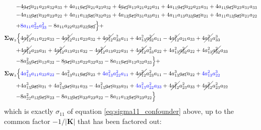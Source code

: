 \documentclass{article}
\begin{document}
\begin{equation}
\begin{aligned}
- & 4 \cancel{a_{12}} a_{21} a_{23} a_{32} a_{33} + 4 a_{11} \cancel{a_{12}} a_{21} a_{23} a_{32} + 4 \cancel{a_{12}} a_{13} a_{21} a_{22} a_{31} + 4 a_{11} \cancel{a_{12}} a_{22} a_{23} a_{31} + 4 a_{11} \cancel{a_{12}} a_{23} a_{31} a_{33} \\
-& 4 a_{13} \cancel{a_{31}} a_{32} a_{23} a_{22} + 4 a_{11} a_{13} \cancel{a_{31}} a_{32} a_{23} + 4 a_{13} \cancel{a_{12}} a_{31} a_{33} a_{21} + 4 a_{11} a_{13} a_{33} \cancel{a_{32}} a_{21} + 4 a_{11} a_{13} \cancel{a_{32}} a_{21} a_{22} \\
+& \textcolor{blue}{8 a_{11} a_{22}^{2} a_{33}^{2}} - 8 a_{11} a_{22} a_{33} a_{23} \cancel{a_{32}}\Bigr\} + \\
 \mathbf{\Sigma}_{\textbf{W}_{2}} \Bigl\{& 4 \cancel{a_{12}^{2}} a_{11} a_{22} a_{33} - 4 \cancel{a_{12}^{2}} a_{11} a_{23} a_{32} + 4 \cancel{a_{12}^{2}} a_{33}^{2} a_{11} + 4 a_{13}^{2} \cancel{a_{32}^{2}} a_{11} - 4 \cancel{a_{12}^{3}} a_{21} a_{33} + 4 \cancel{a_{12}^{2}} a_{33}^{3} \\
+& 4 \cancel{a_{12}^{3}} a_{23} a_{31} + 4 \cancel{a_{12}^{2}} a_{13} a_{21} a_{32} - 4 \cancel{a_{12}^{2}} a_{13} a_{22} a_{31} + 4 \cancel{a_{12}^{2}} a_{33}^{2} a_{22} + 4 a_{13}^{2} \cancel{a_{32}^{2}} a_{22} + 4 a_{13}^{2} \cancel{a_{32}^{2}} a_{33} \\
-& 8 a_{33}^{2} \cancel{a_{12}} a_{13} a_{32} - 8 \cancel{a_{12}} a_{13} a_{22} a_{32} a_{33} - 8 a_{11} \cancel{a_{12}} a_{13} a_{32} a_{33}\Bigr\} + \\
\mathbf{\Sigma}_{\textbf{W}_{3}} \Bigl\{& \textcolor{blue}{4 a_{13}^{2} a_{11} a_{33} a_{22}} - 4 a_{13}^{2} a_{11} \cancel{a_{32}} a_{23} + \textcolor{blue}{4 a_{13}^{2} a_{22}^{2} a_{11}} + 4 \cancel{a_{12}^{2}} a_{23}^{2} a_{11} - 4 a_{13}^{3} \cancel{a_{31}} a_{22} + \textcolor{blue}{4 a_{13}^{2} a_{22}^{3}} \\
+& 4 a_{13}^{3} \cancel{a_{32}} a_{21} + 4 a_{13}^{2} \cancel{a_{12}} a_{31} a_{23} - 4 a_{13}^{2} \cancel{a_{12}} a_{33} a_{21} + \textcolor{blue}{4 a_{13}^{2} a_{22}^{2} a_{33}} + 4 \cancel{a_{12}^{2}} a_{23}^{2} a_{33} + 4 \cancel{a_{12}^{2}} a_{23}^{2} a_{22} \\
-& 8 a_{22}^{2} a_{13} \cancel{a_{12}} a_{23} - 8 a_{13} \cancel{a_{12}} a_{33} a_{23} a_{22} - 8 a_{11} a_{13} \cancel{a_{12}} a_{23} a_{22}\Bigr\}
\end{aligned}
\end{equation}
which is exactly $\sigma_{11}$ of equation \ref{eq:sigma11_confounder} above, up to the common factor $-1/|\mathbf{K}|$ that has been factored out:
\end{document}
